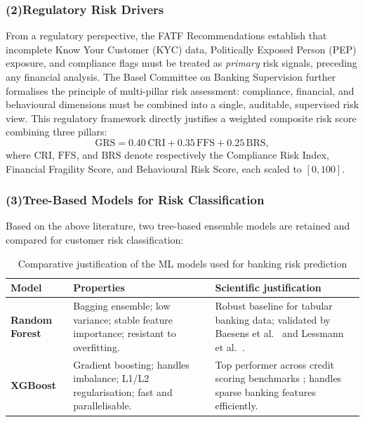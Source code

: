\subsubsection{(2)Regulatory Risk Drivers}

From a regulatory perspective, the FATF Recommendations \cite{fatf2012} establish that
incomplete Know Your Customer (KYC) data, Politically Exposed Person (PEP) exposure, and
compliance flags must be treated as \textit{primary} risk signals, preceding any financial
analysis. The Basel Committee on Banking Supervision \cite{bcbs2011} further formalises the
principle of multi-pillar risk assessment: compliance, financial, and behavioural dimensions
must be combined into a single, auditable, supervised risk view. This regulatory framework
directly justifies a weighted composite risk score combining three pillars:
\begin{equation}
\label{eq:global_risk_score}
\mathrm{GRS} = 0.40\,\mathrm{CRI} + 0.35\,\mathrm{FFS} + 0.25\,\mathrm{BRS},
\end{equation}
where $\mathrm{CRI}$, $\mathrm{FFS}$, and $\mathrm{BRS}$ denote respectively the
Compliance Risk Index, Financial Fragility Score, and Behavioural Risk Score, each
scaled to $[0,100]$.

\subsubsection{(3)Tree-Based Models for Risk Classification}

Based on the above literature, two tree-based ensemble models are retained and compared
for customer risk classification:

\begin{table}[H]
\centering
\small
\caption{Comparative justification of the ML models used for banking risk prediction}
\label{tab:atb_ml_models}
\begin{tabular}{|p{3cm}|p{5cm}|p{5.2cm}|}
\hline
\rowcolor{blue!15}
\textbf{Model} & \textbf{Properties} & \textbf{Scientific justification} \\
\hline
\textbf{Random Forest} \cite{breiman2001} &
Bagging ensemble; low variance; stable feature importance; resistant to overfitting. &
Robust baseline for tabular banking data; validated by Baesens et al.\ \cite{baesens2003}
and Lessmann et al.\ \cite{lessmann2015}. \\
\hline
\textbf{XGBoost} \cite{chen2016} &
Gradient boosting; handles imbalance; L1/L2 regularisation; fast and parallelisable. &
Top performer across credit scoring benchmarks \cite{lessmann2015, dastile2020}; handles
sparse banking features efficiently. \\
\hline
\end{tabular}
\end{table}




